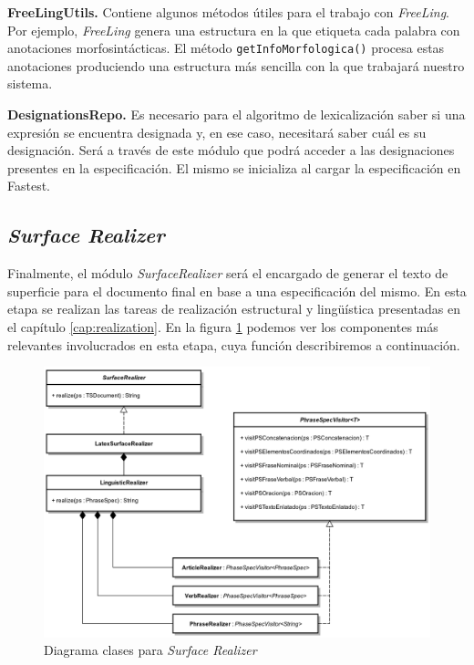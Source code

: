 \bigskip
\noindent
\textbf{FreeLingUtils.} Contiene algunos métodos útiles para el trabajo con \textit{FreeLing}. Por ejemplo, \textit{FreeLing} genera una estructura en la que etiqueta cada palabra con anotaciones morfosintácticas. El método \texttt{getInfoMorfologica()} procesa estas anotaciones produciendo una estructura más sencilla con la que trabajará nuestro sistema.

\bigskip
\noindent
\textbf{DesignationsRepo.} Es necesario para el algoritmo de lexicalización saber si una expresión se encuentra designada y, en ese caso, necesitará saber cuál es su designación. Será a través de este módulo que podrá acceder a las designaciones presentes en la especificación. El mismo se inicializa al cargar la especificación en Fastest. 

\subsection{\textit{Surface Realizer}}

Finalmente, el módulo \emph{SurfaceRealizer} será el encargado de generar el texto de superficie para el documento final en base a una especificación del mismo. En esta etapa se realizan las tareas de realización estructural y lingüística presentadas en el capítulo \ref{cap:realization}. En la figura \ref{fig:imp_surfrealizer} podemos ver los componentes más relevantes involucrados en esta etapa, cuya función describiremos a continuación. 

\begin{figure}[H]
  	\centering
	\includegraphics[scale=0.20]{img/realizer_imp.png}
	\caption{Diagrama clases para \textit{Surface Realizer}}
  	\label{fig:imp_surfrealizer}
\end{figure}

